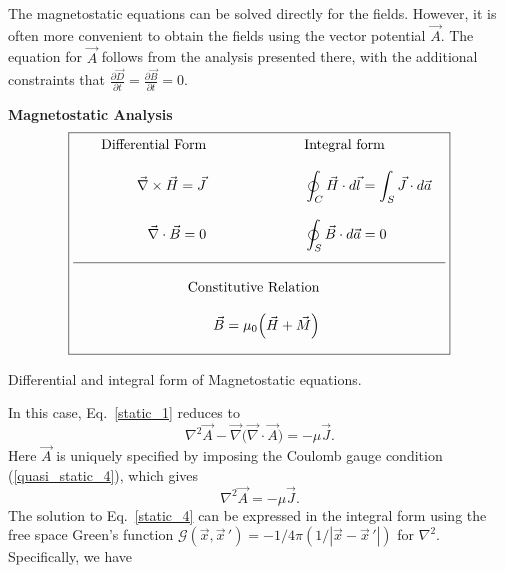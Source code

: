 \documentclass[11pt,a4paper,oneside]{book}
\numberwithin{equation}{section}
\newcommand{\abs}[1]{\left|#1\right|}
\theoremstyle{it}
\theoremstyle{definition}
\begin{document}
The magnetostatic equations can be solved directly for the fields. However, it is often more convenient to obtain the fields using the vector potential $\vec{A}$. The equation for $\vec{A}$ follows from the analysis presented there, with the additional constraints that $\frac{\partial \vec{D}}{\partial t} = \frac{\partial \vec{B}}{\partial t}=0$.
\begin{table}[H]
	\centering \textbf{Magnetostatic Analysis} \\
\begin{equation*}
\boxed{\begin{aligned}
	\begin{aligned}
		&\quad &\text{Differential Form} &\qquad &\qquad \qquad& \text{Integral form} & \\[8pt] 
		&\quad &\vec{\nabla}\times\vec{H}=\vec{J} &\qquad &\qquad \qquad& \oint_C\vec{H}\cdot d\vec{l}=\int_S\vec{J}\cdot d\vec{a} &	\\[8pt]  
		&\quad &\vec{\nabla} \cdot\vec{B}=0 &\qquad &\qquad \qquad& \oint_{S}\vec{B}\cdot d\vec{a}=0 & \\[8pt]
		\hline
	\end{aligned} \\[8pt] 
	\begin{aligned}
		&\qquad  &\qquad  &\qquad &\text{Constitutive Relation}  &\quad  &\qquad \qquad& \qquad& \\[8pt] 
		&\qquad  &\qquad  &\qquad &\vec{B}=\mu_0\Big(\vec{H}+\vec{M}\Big)  &\quad  &\qquad \qquad&  \qquad& \\[8pt] 
	\end{aligned}
\end{aligned}}
\end{equation*}
	\caption{Differential and integral form of Magnetostatic equations.}
	\label{static_table}
\end{table}
In this case, Eq.~\eqref{static_1} reduces to 
\begin{equation}\label{static_3}
\nabla^2\vec{A}-\vec{\nabla}\big(\vec{\nabla}\cdot\vec{A}\big)=-\mu\vec{J}.
\end{equation} 
Here $\vec{A}$ is uniquely specified by imposing the Coulomb gauge condition (\ref{quasi_static_4}), which gives 
\begin{equation}\label{static_4}
	\nabla^2\vec{A}=-\mu\vec{J}.
\end{equation} 
The solution to Eq.~\eqref{static_4} can be expressed in the integral form using the free space Green's function $\mathcal{G}(\vec{x},\vec{x}\,')=-1/4\pi(1/\abs{\vec{x}-\vec{x}\,'})$ for $\nabla^2$. Specifically, we have
\end{document}
